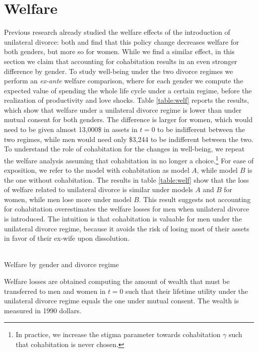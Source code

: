 \documentclass[12pt]{article}
\numberwithin{table}{section}
\begin{document}
\section{Welfare}
Previous research already studied the welfare effects of the introduction of unilateral divorce: both \cite{reynoso2019} and \cite{fernandez2017} find that this policy change decreases welfare for both genders, but more so for women. While we find a similar effect, in this section we claim that accounting for cohabitation results in an even stronger difference by gender.
To study well-being under the two divorce regimes we perform an \textit{ex-ante} welfare comparison, where for each gender we compute the expected value of spending the whole life cycle under a certain regime, before the realization of productivity and love shocks. Table \ref{table:welf} reports the results, which show that welfare under a unilateral divorce regime is lower than under mutual consent for both genders. The difference is larger for women, which would need to be given almost 13,000\$ in assets in $t=0$ to be indifferent between the two regimes, while men would need only \$3,244 to be indifferent between the two. To understand the role of cohabitation for the changes in well-being, we repeat the welfare analysis assuming that cohabitation in no longer a choice.\footnote{In practice, we increase the stigma parameter towards cohabitation $\gamma$ such that cohabitation is never chosen.} For ease of exposition, we refer to the model with cohabitation as model $A$, while model $B$ is the one without cohabitation. The results in table \ref{table:welf} show that the loss of welfare related to unilateral divorce is similar under models $A$ and $B$ for women, while men lose more under model $B$. This result suggests not accounting for cohabitation overestimates the welfare losses for men when unilateral divorce is introduced. The intuition is that cohabitation is valuable for men under the unilateral divorce regime, because it avoids the risk of losing most of their assets in favor of their ex-wife upon dissolution.
\begin{table}[htbp]\centering
\caption{\\Welfare by gender and divorce regime}
\label{table:welf}
\begin{threeparttable}[t]\centering

\begin{tablenotes}[flushleft]
\footnotesize{\item Welfare losses are obtained computing the amount of wealth that must be transferred to men and women in $t=0$ such that their lifetime utility under the unilateral divorce regime equals the one under mutual consent. The wealth is measured in 1990 dollars.}
\end{tablenotes}
\end{threeparttable}
\end{table}
\FloatBarrier
\end{document}
